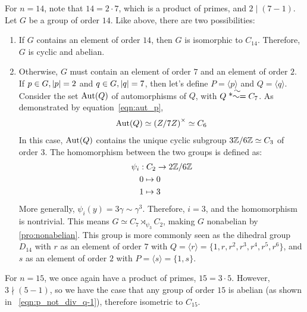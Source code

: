 For $n = 14$, note that $14 = 2 \cdot 7$, which is a product of primes,
and $2 \mid (7 - 1)$.
Let $G$ be a group of order $14$.
Like above, there are two possibilities:
\begin{enumerate}
  \item If $G$ contains an element of order $14$, then $G$ is isomorphic to $C_{14}$.
    Therefore, $G$ is cyclic and abelian.
  \item Otherwise, $G$ must contain an element of order $7$ and an element of order $2$.
    If $p \in G, \lvert p\rvert = 2$ and $q \in G, \lvert q\rvert = 7$,
    then let's define $P = \langle p \rangle$ and $Q = \langle q \rangle$.
    Consider the set $\operatorname{Aut}(Q)$ of automorphisms of $Q$, with $Q \isom C_7$.
    As demonstrated by equation~\ref{eqn:aut_p},
    \begin{align}
      \operatorname{Aut}(Q) \simeq {(Z/7Z)}^\times \simeq C_6
    \end{align}
    In this case, $\operatorname{Aut}(Q)$ contains the unique cyclic subgroup $3\mathbb{Z}/6\mathbb{Z} \simeq C_3$
    of order $3$. The homomorphism between the two groups is defined as:
    \begin{align*}
      \psi_i &: C_2 \to 2\mathbb{Z}/6\mathbb{Z} \\
           & 0 \mapsto 0 \\
           & 1 \mapsto 3 \\
    \end{align*}
    More generally, $\psi_i (y) = 3 \gamma \sim \gamma^3$.
    Therefore, $i = 3$, and the homomorphism is nontrivial.
    This means $G \simeq C_7 \rtimes_{\psi_3} C_2$, making $G$ nonabelian
    by \ref{pro:nonabelian}.
    This group is more commonly seen as the dihedral group $D_{14}$
    with $r$ as an element of order $7$ with
    $Q = \langle r \rangle = \{ 1, r, r^2, r^3, r^4, r^5, r^6 \}$,
    and $s$ as an element of order $2$ with $P = \langle s \rangle = \{ 1, s \}$.
\end{enumerate}

For $n = 15$, we once again have a product of primes, $15 = 3 \cdot 5$.
However, $3 \nmid (5 - 1)$, so we have the case that any group of order $15$
is abelian (as shown in ~\ref{eqn:p_not_div_q-1}), therefore isometric to $C_{15}$.
